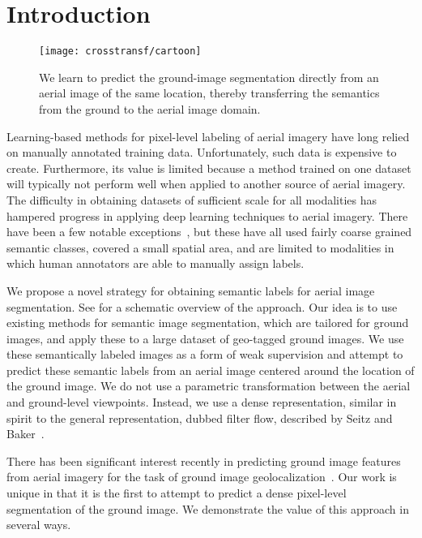 \section{Introduction}

\begin{figure}[t]
	\centering
	\texttt{[image: crosstransf/cartoon]}
  \caption{We learn to predict the ground-image
    segmentation directly from an aerial image of the same location,
  thereby transferring the semantics from the ground to the aerial
image domain.}
	\label{fig:overview}
\end{figure}


Learning-based methods for pixel-level labeling of aerial imagery
have long relied on manually annotated training data. Unfortunately,
such data is expensive to create. Furthermore, its value is limited
because a method trained on one dataset will typically not perform
well when applied to another source of aerial imagery.  The
difficulty in obtaining datasets of sufficient scale for all
modalities has hampered progress in applying deep learning techniques
to aerial imagery.  There have been a few notable
exceptions~\cite{mnih2010learning,paisitkriangkrai2015effective}, but
these have all used fairly coarse grained semantic classes, covered a
small spatial area, and are limited to modalities in which human
annotators are able to manually assign labels.

We propose a novel strategy for obtaining semantic labels for
aerial image segmentation.  See  for a schematic
overview of the approach.  Our idea is to use existing methods for
semantic image segmentation, which are tailored for ground
images, and apply these to a large dataset of geo-tagged ground
images.  We use these semantically labeled images as a form of weak
supervision and attempt to predict these semantic labels from an
aerial image centered around the location of the ground
image.  We do not use a parametric transformation between the
aerial and ground-level viewpoints.  Instead, we use a dense
representation, similar in spirit to the general representation,
dubbed filter flow, described by Seitz and Baker~\cite{filterflow}.  

There has been significant interest recently in predicting
ground image features from aerial imagery for the task of
ground image geolocalization~\cite{workman2015wide}. Our work is
unique in that it is the first to attempt to predict a dense
pixel-level segmentation of the ground image. We demonstrate the
value of this approach in several ways. 

